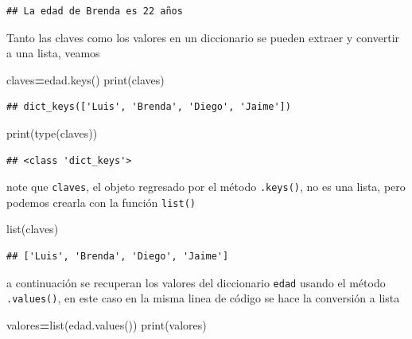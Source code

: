 \documentclass[
]{book}
\newenvironment{Shaded}{\begin{snugshade}}{\end{snugshade}}
\newcommand{\BuiltInTok}[1]{#1}
\newcommand{\NormalTok}[1]{#1}
\newcommand{\OperatorTok}[1]{\textcolor[rgb]{0.81,0.36,0.00}{\textbf{#1}}}
\theoremstyle{definition}
\theoremstyle{definition}
\theoremstyle{definition}
\theoremstyle{definition}
\theoremstyle{remark}
\begin{document}
\begin{verbatim}
## La edad de Brenda es 22 años
\end{verbatim}

Tanto las claves como los valores en un diccionario se pueden extraer y convertir a una lista, veamos

\begin{Shaded}
\begin{Highlighting}[]
\NormalTok{claves}\OperatorTok{=}\NormalTok{edad.keys()}
\BuiltInTok{print}\NormalTok{(claves) }
\end{Highlighting}
\end{Shaded}

\begin{verbatim}
## dict_keys(['Luis', 'Brenda', 'Diego', 'Jaime'])
\end{verbatim}

\begin{Shaded}
\begin{Highlighting}[]
\BuiltInTok{print}\NormalTok{(}\BuiltInTok{type}\NormalTok{(claves)) }
\end{Highlighting}
\end{Shaded}

\begin{verbatim}
## <class 'dict_keys'>
\end{verbatim}

note que \texttt{claves}, el objeto regresado por el método \texttt{.keys()}, no es una lista, pero podemos crearla con la función \texttt{list()}

\begin{Shaded}
\begin{Highlighting}[]
\BuiltInTok{list}\NormalTok{(claves) }
\end{Highlighting}
\end{Shaded}

\begin{verbatim}
## ['Luis', 'Brenda', 'Diego', 'Jaime']
\end{verbatim}

a continuación se recuperan los valores del diccionario \texttt{edad} usando el método \texttt{.values()}, en este caso en la misma linea de código se hace la conversión a lista

\begin{Shaded}
\begin{Highlighting}[]
\NormalTok{valores}\OperatorTok{=}\BuiltInTok{list}\NormalTok{(edad.values())  }
\BuiltInTok{print}\NormalTok{(valores) }
\end{Highlighting}
\end{Shaded}
\end{document}
